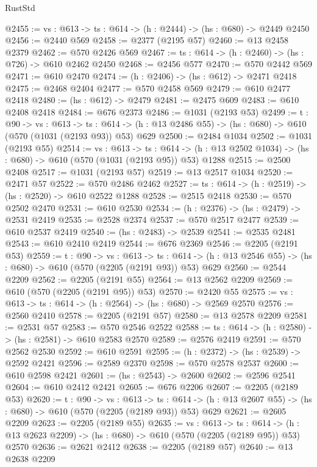 \begin{lexlean}{RustStd}
\begin{coremodule}
@2455 := {vs : @613} -> {ts : @614} -> (h : @2444) -> (hs : @680) -> @2449 @2450
@2456 := @2440 @569
@2458 := @2377 (@2195 @57)
@2460 := @13 @2458 @2379
@2462 := @570 @2426 @569
@2467 := {ts : @614} -> (h : @2460) -> (hs : @726) -> @610 @2462 @2450
@2468 := @2456 @577
@2470 := @570 @2442 @569
@2471 := @610 @2470
@2474 := (h : @2406) -> (hs : @612) -> @2471 @2418
@2475 := @2468 @2404
@2477 := @570 @2458 @569
@2479 := @610 @2477 @2418
@2480 := (hs : @612) -> @2479
@2481 := @2475 @609
@2483 := @610 @2408 @2418
@2484 := @676 @2373
@2486 := @1031 (@2193 @53)
@2499 := {t : @90} ->
  {vs : @613} ->
  {ts : @614} -> (h : @13 @2486 @55) -> (hs : @680) -> @610 (@570 (@1031 (@2193 @93)) @53) @629
@2500 := @2484 @1034
@2502 := @1031 (@2193 @55)
@2514 := {vs : @613} ->
  {ts : @614} -> (h : @13 @2502 @1034) -> (hs : @680) -> @610 (@570 (@1031 (@2193 @95)) @53) @1288
@2515 := @2500 @2408
@2517 := @1031 (@2193 @57)
@2519 := @13 @2517 @1034
@2520 := @2471 @57
@2522 := @570 @2486 @2462
@2527 := {ts : @614} -> (h : @2519) -> (hs : @2520) -> @610 @2522 @1288
@2528 := @2515 @2418
@2530 := @570 @2502 @2470
@2531 := @610 @2530
@2534 := (h : @2376) -> (hs : @2479) -> @2531 @2419
@2535 := @2528 @2374
@2537 := @570 @2517 @2477
@2539 := @610 @2537 @2419
@2540 := (hs : @2483) -> @2539
@2541 := @2535 @2481
@2543 := @610 @2410 @2419
@2544 := @676 @2369
@2546 := @2205 (@2191 @53)
@2559 := {t : @90} ->
  {vs : @613} ->
  {ts : @614} -> (h : @13 @2546 @55) -> (hs : @680) -> @610 (@570 (@2205 (@2191 @93)) @53) @629
@2560 := @2544 @2209
@2562 := @2205 (@2191 @55)
@2564 := @13 @2562 @2209
@2569 := @610 (@570 (@2205 (@2191 @95)) @53)
@2570 := @2420 @55
@2575 := {vs : @613} -> {ts : @614} -> (h : @2564) -> (hs : @680) -> @2569 @2570
@2576 := @2560 @2410
@2578 := @2205 (@2191 @57)
@2580 := @13 @2578 @2209
@2581 := @2531 @57
@2583 := @570 @2546 @2522
@2588 := {ts : @614} -> (h : @2580) -> (hs : @2581) -> @610 @2583 @2570
@2589 := @2576 @2419
@2591 := @570 @2562 @2530
@2592 := @610 @2591
@2595 := (h : @2372) -> (hs : @2539) -> @2592 @2421
@2596 := @2589 @2370
@2598 := @570 @2578 @2537
@2600 := @610 @2598 @2421
@2601 := (hs : @2543) -> @2600
@2602 := @2596 @2541
@2604 := @610 @2412 @2421
@2605 := @676 @2206
@2607 := @2205 (@2189 @53)
@2620 := {t : @90} ->
  {vs : @613} ->
  {ts : @614} -> (h : @13 @2607 @55) -> (hs : @680) -> @610 (@570 (@2205 (@2189 @93)) @53) @629
@2621 := @2605 @2209
@2623 := @2205 (@2189 @55)
@2635 := {vs : @613} ->
  {ts : @614} -> (h : @13 @2623 @2209) -> (hs : @680) -> @610 (@570 (@2205 (@2189 @95)) @53) @2570
@2636 := @2621 @2412
@2638 := @2205 (@2189 @57)
@2640 := @13 @2638 @2209

\end{coremodule}
\end{lexlean}
